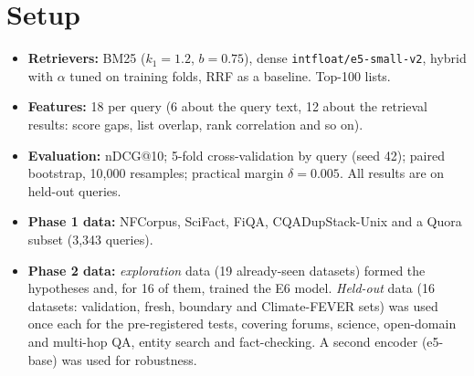 \documentclass[10pt,twocolumn]{article}
\begin{document}
\section{Setup}

\begin{itemize}
  \item \textbf{Retrievers:} BM25 ($k_1{=}1.2$, $b{=}0.75$), dense \texttt{intfloat/e5-small-v2}, hybrid with $\alpha$ tuned on training folds, RRF as a baseline. Top-100 lists.
  \item \textbf{Features:} 18 per query (6 about the query text, 12 about the retrieval results: score gaps, list overlap, rank correlation and so on).
  \item \textbf{Evaluation:} nDCG@10; 5-fold cross-validation by query (seed 42); paired bootstrap, 10,000 resamples; practical margin $\delta = 0.005$. All results are on held-out queries.
  \item \textbf{Phase 1 data:} NFCorpus, SciFact, FiQA, CQADupStack-Unix and a Quora subset (3,343 queries).
  \item \textbf{Phase 2 data:} \emph{exploration} data (19 already-seen datasets) formed the hypotheses and, for 16 of them, trained the E6 model. \emph{Held-out} data (16 datasets: validation, fresh, boundary and Climate-FEVER sets) was used once each for the pre-registered tests, covering forums, science, open-domain and multi-hop QA, entity search and fact-checking. A second encoder (e5-base) was used for robustness.
\end{itemize}
\end{document}
